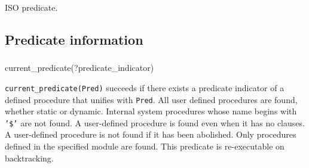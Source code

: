 \Portability

ISO predicate.

\subsection{Predicate information}

\subsubsection{\label{current-predicate/1}}

\begin{TemplatesOneCol}
current\_predicate(?predicate\_indicator)

\end{TemplatesOneCol}

\Description

\texttt{current\_predicate(Pred)} succeeds if there exists a predicate
indicator of a defined procedure that unifies with \texttt{Pred}. All user
defined procedures are found, whether static or dynamic. Internal system
procedures whose name begins with \texttt{'\$'} are not found. A user-defined
procedure is found even when it has no clauses. A user-defined procedure is
not found if it has been abolished. Only procedures defined in the specified
module are found. This predicate is re-executable on backtracking.

\begin{PlErrors}






\end{PlErrors}

